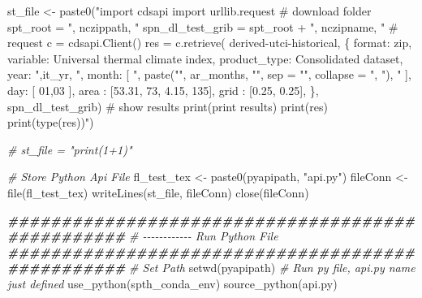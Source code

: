\documentclass[
]{book}
\newenvironment{Shaded}{\begin{snugshade}}{\end{snugshade}}
\newcommand{\AttributeTok}[1]{\textcolor[rgb]{0.77,0.63,0.00}{#1}}
\newcommand{\CommentTok}[1]{\textcolor[rgb]{0.56,0.35,0.01}{\textit{#1}}}
\newcommand{\DocumentationTok}[1]{\textcolor[rgb]{0.56,0.35,0.01}{\textbf{\textit{#1}}}}
\newcommand{\FunctionTok}[1]{\textcolor[rgb]{0.00,0.00,0.00}{#1}}
\newcommand{\NormalTok}[1]{#1}
\newcommand{\OtherTok}[1]{\textcolor[rgb]{0.56,0.35,0.01}{#1}}
\newcommand{\StringTok}[1]{\textcolor[rgb]{0.31,0.60,0.02}{#1}}
\begin{document}
\begin{Shaded}
\begin{Highlighting}[]
\NormalTok{    st\_file }\OtherTok{\textless{}{-}} \FunctionTok{paste0}\NormalTok{(}\StringTok{"import cdsapi}
\StringTok{import urllib.request}
\StringTok{\# download folder}
\StringTok{spt\_root = \textquotesingle{}"}\NormalTok{, nczippath, }\StringTok{"\textquotesingle{}}
\StringTok{spn\_dl\_test\_grib = spt\_root + \textquotesingle{}"}\NormalTok{, nczipname, }\StringTok{"\textquotesingle{}}
\StringTok{\# request}
\StringTok{c = cdsapi.Client()}
\StringTok{res = c.retrieve(}
\StringTok{    \textquotesingle{}derived{-}utci{-}historical\textquotesingle{},}
\StringTok{    \{}
\StringTok{        \textquotesingle{}format\textquotesingle{}: \textquotesingle{}zip\textquotesingle{},}
\StringTok{        \textquotesingle{}variable\textquotesingle{}: \textquotesingle{}Universal thermal climate index\textquotesingle{},}
\StringTok{        \textquotesingle{}product\_type\textquotesingle{}: \textquotesingle{}Consolidated dataset\textquotesingle{},}
\StringTok{        \textquotesingle{}year\textquotesingle{}: \textquotesingle{}"}\NormalTok{,it\_yr, }\StringTok{"\textquotesingle{},}
\StringTok{        \textquotesingle{}month\textquotesingle{}: [}
\StringTok{            "}\NormalTok{, }\FunctionTok{paste}\NormalTok{(}\StringTok{"\textquotesingle{}"}\NormalTok{, ar\_months, }\StringTok{"\textquotesingle{}"}\NormalTok{, }\AttributeTok{sep =} \StringTok{""}\NormalTok{, }\AttributeTok{collapse =} \StringTok{", "}\NormalTok{), }\StringTok{"}
\StringTok{        ],}
\StringTok{        \textquotesingle{}day\textquotesingle{}: [}
\StringTok{            \textquotesingle{}01\textquotesingle{},\textquotesingle{}03\textquotesingle{}}
\StringTok{        ],}
\StringTok{        \textquotesingle{}area\textquotesingle{}  : [53.31, 73, 4.15, 135],}
\StringTok{        \textquotesingle{}grid\textquotesingle{}  : [0.25, 0.25],}
\StringTok{    \},}
\StringTok{    spn\_dl\_test\_grib)}
\StringTok{\# show results}
\StringTok{print(\textquotesingle{}print results\textquotesingle{})}
\StringTok{print(res)}
\StringTok{print(type(res))"}\NormalTok{)}

    \CommentTok{\# st\_file = "print(1+1)"}

    \CommentTok{\# Store Python Api File}
\NormalTok{    fl\_test\_tex }\OtherTok{\textless{}{-}} \FunctionTok{paste0}\NormalTok{(pyapipath, }\StringTok{"api.py"}\NormalTok{)}
\NormalTok{    fileConn }\OtherTok{\textless{}{-}} \FunctionTok{file}\NormalTok{(fl\_test\_tex)}
    \FunctionTok{writeLines}\NormalTok{(st\_file, fileConn)}
    \FunctionTok{close}\NormalTok{(fileConn)}

    \DocumentationTok{\#\#\#\#\#\#\#\#\#\#\#\#\#\#\#\#\#\#\#\#\#\#\#\#\#\#\#\#\#\#\#\#\#\#\#\#\#\#\#\#\#\#\#\#\#\#\#\#\#}
    \CommentTok{\# {-}{-}{-}{-}{-}{-}{-}{-}{-}{-}{-}{-} Run Python File}
    \DocumentationTok{\#\#\#\#\#\#\#\#\#\#\#\#\#\#\#\#\#\#\#\#\#\#\#\#\#\#\#\#\#\#\#\#\#\#\#\#\#\#\#\#\#\#\#\#\#\#\#\#\#}
    \CommentTok{\# Set Path}
    \FunctionTok{setwd}\NormalTok{(pyapipath)}
    \CommentTok{\# Run py file, api.py name just defined}
    \FunctionTok{use\_python}\NormalTok{(spth\_conda\_env)}
    \FunctionTok{source\_python}\NormalTok{(}\StringTok{\textquotesingle{}api.py\textquotesingle{}}\NormalTok{)}


\end{Highlighting}
\end{Shaded}
\end{document}
